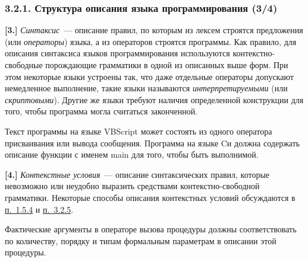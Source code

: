 \documentclass[mathserif,12pt,aspectratio=169]{beamer}
\renewcommand{\index}[1]{}
\def\odmkey#1#2{{\it\color{red} #1}\index{#2}}
\def\DMref#1#2{{\color{blue}\underline{\hyperlink{#2}{#1}}}}
\begin{document}
\begin{frame}
\frametitle{3.2.1. Структура описания языка программирования (3/4)}
{\color{blue}\bf [3.]} \odmkey{Синтаксис}{Синтаксис}~--- описание правил,
по которым из лексем строятся предложения (или
\odmkey{операторы}{Оператор!языка программирования}) языка, а из
операторов строятся программы. Как правило, для описания
синтаксиса языков программирования используются
контекстно-свободные порождающие грамматики в одной из описанных
выше форм. При этом некоторые языки устроены так, что даже
отдельные операторы  допускают немедленное выполнение, такие языки
называются \odmkey{интерпретируемыми}{Язык!интерпретируемый} (или
\odmkey{скриптовыми}{Язык!скриптовый}). Другие же языки требуют
наличия определенной конструкции для того, чтобы программа могла
считаться законченной.
\begin{example}
Текст программы на языке VBScript может состоять из одного
оператора присваивания или вывода сообщения. Программа на языке Cи
должна содержать описание функции с именем main для того, чтобы
быть выполнимой.
\end{example}

\smallskip
{\color{blue}\bf [4.]}  \odmkey{Контекстные условия}{Условие!контекстное}~---
описание синтаксических правил,
которые невозможно или неудобно выразить средствами
контекстно-свободной грамматики. Некоторые способы описания
контекстных условий обсуждаются в  
\DMref{п.~1.5.4}{1.5.4.} и \DMref{п.~3.2.5}{3.2.5.}.
\begin{example}
Фактические аргументы в операторе вызова процедуры должны
соответствовать по количеству, порядку и типам формальным
параметрам в описании этой процедуры.
\end{example}
\end{frame}
\end{document}
